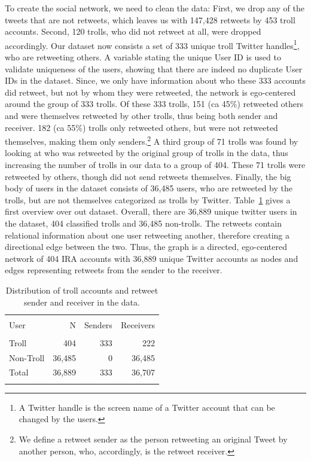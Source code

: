 \documentclass[12pt, titlepage=true, toc=bib]{scrartcl}
\begin{document}
To create the social network, we need to clean the data: First, we drop any of the tweets that are not retweets, which leaves us with 147,428 retweets by 453 troll accounts. Second, 120 trolls, who did not retweet at all, were dropped accordingly. Our dataset now consists a set of 333 unique troll Twitter handles\footnote{A Twitter handle is the screen name of a Twitter account that can be changed by the users.}, who are retweeting others. A variable stating the unique User ID is used to validate uniqueness of the users, showing that there are indeed no duplicate User IDs in the dataset. Since, we only have information about who these 333 accounts did retweet, but not by whom they were retweeted, the network is ego-centered around the group of 333 trolls. Of these 333 trolls, 151 (ca 45\%) retweeted others and were themselves retweeted by other trolls, thus being both sender and receiver. 182 (ca 55\%) trolls only retweeted others, but were not retweeted themselves, making them only senders.\footnote{We define a retweet sender as the person retweeting an original Tweet by another person, who, accordingly, is the retweet receiver.} A third group of 71 trolls was found by looking at who was retweeted by the original group of trolls in the data, thus increasing the number of trolls in our data to a group of 404. These 71 trolls were retweeted by others, though did not send retweets themselves. Finally, the big body of users in the dataset consists of 36,485 users, who are retweeted by the trolls, but are not themselves categorized as trolls by Twitter. Table~\ref{tab:userstat} gives a first overview over out dataset. Overall, there are 36,889 unique twitter users in the dataset, 404 classified trolls and 36,485 non-trolls. The retweets contain relational information about one user retweeting another, therefore creating a directional edge between the two. Thus, the graph is a directed, ego-centered network of 404 IRA accounts with 36,889 unique Twitter accounts as nodes and edges representing retweets from the sender to the receiver.

\begin{table}[!ht] \centering 
\begin{tabular*}{.95\linewidth}{@{\extracolsep{\fill}} lrrr} 
\\[-1.8ex]\hline 
\hline \\[-1.8ex] 
User & N & Senders & Receivers \\ 
\hline \\[-1.8ex] 
Troll & 404 & 333 & 222 \\ 
Non-Troll & 36,485 & 0 & 36,485 \\ 
Total & 36,889 & 333 & 36,707 \\ 
\hline \\[-1.8ex] 
\end{tabular*} 
  \caption[User Statistics]{Distribution of troll accounts and retweet sender and receiver in the data.}
  \label{tab:userstat} 
\end{table} 
\end{document}

